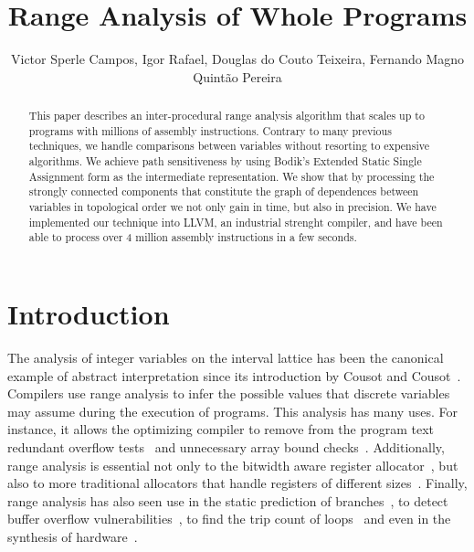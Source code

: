 \documentclass{llncs}
\begin{document}
\title {Range Analysis of Whole Programs}

\author{Victor Sperle Campos, Igor Rafael, Douglas do Couto Teixeira,
Fernando Magno Quint\~{a}o Pereira}



\maketitle

\begin{abstract}
This paper describes an inter-procedural range analysis algorithm that scales
up to programs with millions of assembly instructions.
Contrary to many previous techniques, we handle comparisons between variables
without resorting to expensive algorithms.
We achieve path sensitiveness by using Bodik's Extended Static Single
Assignment form as the intermediate representation.
We show that by processing the strongly connected components that constitute
the graph of dependences between variables in topological order we not only
gain in time, but also in precision.
We have implemented our technique into LLVM, an industrial strenght compiler,
and have been able to process over 4 million assembly instructions in a
few seconds.
\end{abstract}

\section{Introduction}
\label{sec:intro}

The analysis of integer variables on the interval lattice has been the
canonical example of abstract interpretation since its introduction by
Cousot and Cousot~\cite{Cousot77}.
Compilers use range analysis to infer the possible values that discrete
variables may assume during the execution of programs.
This analysis has many uses.
For instance, it allows the optimizing compiler to remove from the program text
redundant overflow tests~\cite{Sol11} and unnecessary array bound
checks~\cite{Bodik00}.
Additionally, range analysis is essential not only to the bitwidth aware
register allocator~\cite{Barik06,Tallam03}, but also to more traditional
allocators that handle registers of different
sizes~\cite{Kong98,Pereira08,Scholz02}.
Finally, range analysis has also seen use in the static prediction of
branches~\cite{Patterson95}, to detect buffer overflow
vulnerabilities~\cite{Simon08,Wagner00}, to find the trip count of
loops~\cite{Lokuciejewski09}
and even in the synthesis of hardware~\cite{Cong05,Mahlke01}.
\end{document}
